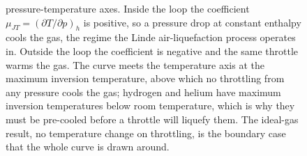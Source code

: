 \begin{figure}[htbp]
{pressure-temperature axes. Inside the loop the coefficient $\mu_{JT} =
(\partial T/\partial p)_h$ is positive, so a pressure drop at constant enthalpy
cools the gas, the regime the Linde air-liquefaction process operates in. Outside
the loop the coefficient is negative and the same throttle warms the gas. The
curve meets the temperature axis at the maximum inversion temperature, above
which no throttling from any pressure cools the gas; hydrogen and helium have
maximum inversion temperatures below room temperature, which is why they must be
pre-cooled before a throttle will liquefy them. The ideal-gas result, no
temperature change on throttling, is the boundary case that the whole curve is
drawn around.}
\label{fig:vol04ch01:jt-inversion}
\end{figure}
